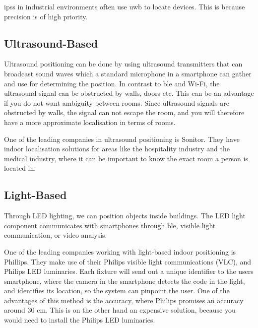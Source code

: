\gls{ips}s in industrial environments often use \gls{uwb} to locate devices. This is because precision is of high priority.\cite{Infsoft}

\subsection{Ultrasound-Based}
Ultrasound positioning can be done by using ultrasound transmitters that can broadcast sound waves which a standard microphone in a smartphone can gather and use for determining the position\cite{IPSMapsPeople}. In contrast to \gls{ble} and Wi-Fi, the ultrasound signal can be obstructed by walls, doors etc. This can be an advantage if you do not want ambiguity between rooms. Since ultrasound signals are obstructed by walls, the signal can not escape the room, and you will therefore have a more approximate localisation in terms of rooms. \cite{leverage-ultrasound}

One of the leading companies in ultrasound positioning is Sonitor. They have indoor localisation solutions for areas like the hospitality industry and the medical industry, where it can be important to know the exact room a person is located in. \cite{sonitor}

\subsection{Light-Based}
Through LED lighting, we can position objects inside buildings. The LED light component communicates with smartphones through \gls{ble}, visible light communication, or video analysis.\cite{IPSMapsPeople}

One of the leading companies working with light-based indoor positioning is Phillips. They make use of their Philips visible light communications (VLC), and Philips LED luminaries. Each fixture will send out a unique identifier to the users smartphone, where the camera in the smartphone detects the code in the light, and identifies its location, so the system can pinpoint the user. \cite{philips} One of the advantages of this method is the accuracy, where Philips promises an accuracy around 30 cm. \cite{IPSMapsPeople} This is on the other hand an expensive solution, because you would need to install the Philips LED luminaries. 


